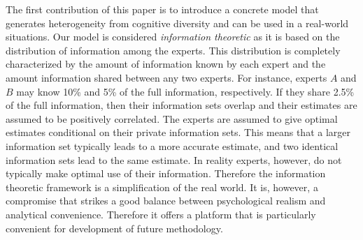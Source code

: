 \documentclass[11pt,twoside]{article}
\begin{document}
The first contribution of this paper is to introduce a concrete model that generates heterogeneity from cognitive diversity and can be used in a real-world situations. 
Our model is considered \textit{information theoretic} as it is based on the distribution of information among the experts. This distribution is completely characterized by the amount of information known by each expert and the amount information shared between any two experts. For instance, experts $A$ and $B$ may know 10\% and 5\%  of the full information, respectively. If they share 2.5\% of the full information, then their information sets overlap and their estimates are assumed to be positively correlated. The experts are assumed to give optimal estimates conditional on their private information sets. This means that a larger information set typically leads to a more accurate estimate, and two identical information sets lead to the same estimate. In reality experts, however, do not typically make optimal use of their information. Therefore the information theoretic framework is a simplification of the real world. It is, however, a compromise that strikes a good balance between psychological realism and analytical convenience. Therefore it offers a platform that is particularly convenient for development of future methodology.
\end{document}
